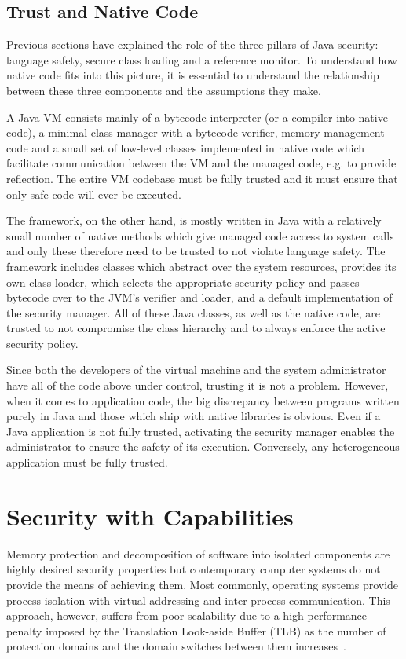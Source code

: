 \documentclass[a4paper,12pt,twoside,openright]{report}
\begin{document}
\subsection{Trust and Native Code}

Previous sections have explained the role of the three pillars of Java security: language safety, secure class loading and a reference monitor. To understand how native code fits into this picture, it is essential to understand the relationship between these three components and the assumptions they make.

A Java VM consists mainly of a bytecode interpreter (or a compiler into native code), a minimal class manager with a bytecode verifier, memory management code and a small set of low-level classes implemented in native code which facilitate communication between the VM and the managed code, e.g. to provide reflection. The entire VM codebase must be fully trusted and it must ensure that only safe code will ever be executed.

The framework, on the other hand, is mostly written in Java with a relatively small number of native methods which give managed code access to system calls and only these therefore need to be trusted to not violate language safety. The framework includes classes which abstract over the system resources, provides its own class loader, which selects the appropriate security policy and passes bytecode over to the JVM's verifier and loader, and a default implementation of the security manager. All of these Java classes, as well as the native code, are trusted to not compromise the class hierarchy and to always enforce the active security policy.

Since both the developers of the virtual machine and the system administrator have all of the code above under control, trusting it is not a problem. However, when it comes to application code, the big discrepancy between programs written purely in Java and those which ship with native libraries is obvious. Even if a Java application is not fully trusted, activating the security manager enables the administrator to ensure the safety of its execution. Conversely, any heterogeneous application must be fully trusted.

\section{Security with Capabilities}

Memory protection and decomposition of software into isolated components are highly desired security properties but contemporary computer systems do not provide the means of achieving them. Most commonly, operating systems provide process isolation with virtual addressing and inter-process communication. This approach, however, suffers from poor scalability due to a high performance penalty imposed by the Translation Look-aside Buffer (TLB) as the number of protection domains and the domain switches between them increases~\cite{watson2012cheri}.
\end{document}
